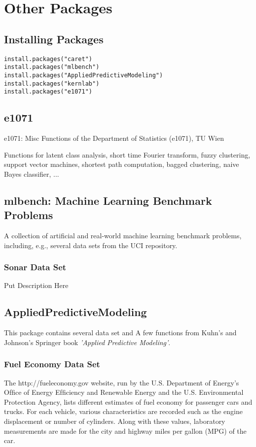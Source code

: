 \documentclass[caret-main.tex]{subfiles}
\begin{document}
\section{Other Packages}

\subsection{Installing Packages}

\begin{framed}
\begin{verbatim}
install.packages("caret")
install.packages("mlbench")
install.packages("AppliedPredictiveModeling")
install.packages("kernlab")
install.packages("e1071")
\end{verbatim}
\end{framed}

\subsection{e1071}
e1071: Misc Functions of the Department of Statistics (e1071), TU Wien

Functions for latent class analysis, short time Fourier transform, fuzzy clustering, support vector machines, shortest path computation, bagged clustering, naive Bayes classifier, ...

\subsection{mlbench: Machine Learning Benchmark Problems}

A collection of artificial and real-world machine learning benchmark problems, including, e.g., several data sets from the UCI repository.


\subsubsection{Sonar Data Set}

Put Description Here
\newpage
\subsection{AppliedPredictiveModeling}
This package contains several data set and A few functions from Kuhn's and Johnson's Springer book \emph{'Applied Predictive Modeling'}.

\subsubsection{Fuel Economy Data Set}
The http://fueleconomy.gov website, run by the U.S. Department of Energy’s Ofﬁce of Energy
Efﬁciency and Renewable Energy and the U.S. Environmental Protection Agency, lists different
estimates of fuel economy for passenger cars and trucks. For each vehicle, various characteristics
are recorded such as the engine displacement or number of cylinders. Along with these values,
laboratory measurements are made for the city and highway miles per gallon (MPG) of the car.
\end{document}
